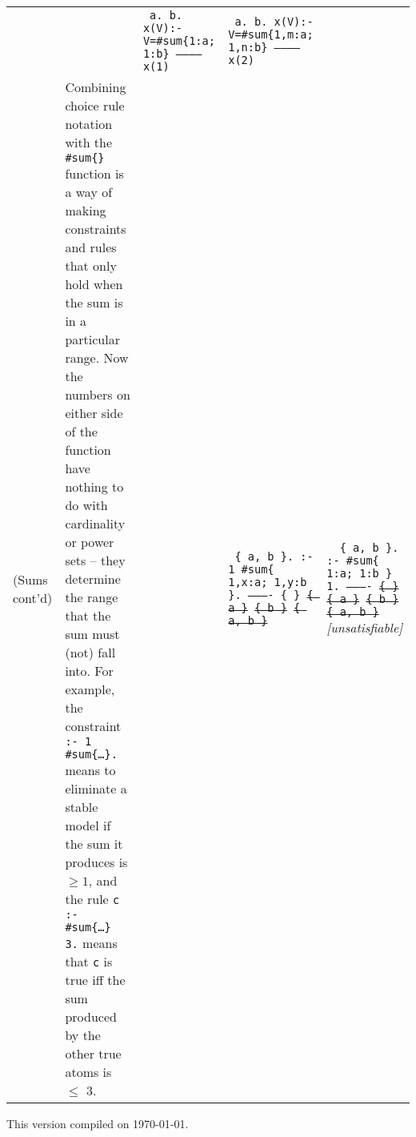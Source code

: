 \documentclass[10pt,a4paper,landscape]{article}
\begin{document}
\begin{longtable}{p{3cm}p{13.5cm}lp{4cm}p{4cm}}
		&& \texttt{%
			{\footnotesize
				a. \newline
				b. \newline
				x(V):-V=\#sum\{1:a; 1:b\}\newline
				----------- \newline
				x(1) }}
		& \texttt{%
			{\footnotesize
			a. \newline
			b. \newline
			x(V):-V=\#sum\{1,m:a; 1,n:b\}\newline
			----------- \newline
			x(2) }} \\ 

	(Sums cont'd)
		& Combining choice rule notation with the \texttt{\#sum\{\}} function is a way of making constraints and rules that only hold when the sum is in a particular range. 
		Now the numbers on either side of the function have nothing to do with cardinality or power sets -- they determine the range that the sum must (not) fall into.
		For example, the constraint \texttt{:- 1 \#sum\{\ldots\}.} means to eliminate a stable model if the sum it produces is $\geq 1$, and the rule \texttt{c :- \#sum\{\ldots\} 3.} means that \texttt{c} is true iff the sum produced by the other true atoms is $\leq$ 3.

		&&\texttt{%
			{\footnotesize
			\{ a, b \}. \newline	
			:- 1 \#sum\{ 1,x:a; 1,y:b \}. \newline
			---------- \newline
			\{ \} \newline
			\sout{\{ a \}} \newline
			\sout{\{ b \}} \newline
			\sout{\{ a, b \}} }}
		& \texttt{%
			{\footnotesize
				\{ a, b \}. \newline	
				:- \#sum\{ 1:a; 1:b \} 1. \newline
				---------- \newline
				\sout{\{ \}} \newline
				\sout{\{ a \}} \newline
				\sout{\{ b \}} \newline
				\sout{\{ a, b \}} } } \newline
			\textit{[unsatisfiable]}
	
\end{longtable}

\vfill \hfill This version compiled on \today.
	
\end{document}
